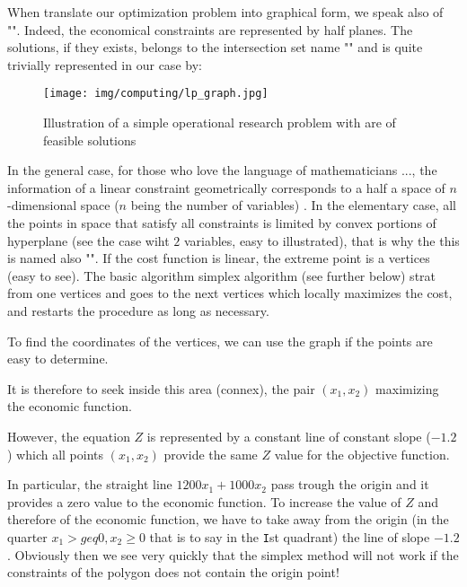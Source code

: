	When translate our optimization problem into graphical form, we speak also of "". Indeed, the economical constraints are represented by half planes. The solutions, if they exists, belongs to the intersection set name "" and is quite trivially represented in our case by:	
	\begin{figure}[H]
		\centering
		\texttt{[image: img/computing/lp\_graph.jpg]}
		\caption{Illustration of a simple operational research problem with are of feasible solutions}
	\end{figure}
	\begin{tcolorbox}[title=Remark,colframe=black,arc=10pt]
	In the general case, for those who love the language of mathematicians ..., the information of a linear constraint geometrically corresponds to a half a space of $n$-dimensional space ($n$ being the number of variables) . In the elementary case, all the points in space that satisfy all constraints is limited by convex portions of hyperplane (see the case wiht $2$ variables, easy to illustrated), that is why the this is named also "". If the cost function is linear, the extreme point is a vertices (easy to see). The basic algorithm simplex algorithm (see further below) strat from one vertices and goes to the next vertices which locally maximizes the cost, and restarts the procedure as long as necessary.
	\end{tcolorbox}	
	To find the coordinates of the vertices, we can use the graph if the points are easy to determine.

	It is therefore to seek inside this area (connex), the pair  $(x_1,x_2)$ maximizing the economic function.

	However, the equation $Z$ is represented by a constant line of constant slope ($-1.2$) which all points $(x_1,x_2)$ provide the same $Z$ value for the objective function.
	
	In particular, the straight line $1200x_1+1000x_2$ pass trough the origin and it provides a zero value to the economic function. To increase the value of $Z$ and therefore of the economic function, we have to take away from the origin (in the quarter $x_1>geq 0,x_2\geq 0$ that is to say in the \texttt{I}st quadrant) the line of slope $-1.2$. Obviously then we see very quickly that the simplex method will not work if the constraints of the polygon does not contain the origin point!
	
